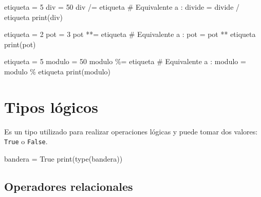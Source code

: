 \documentclass[
  letterpaper,
  DIV=11,
  numbers=noendperiod]{scrreprt}
\newenvironment{Shaded}{\begin{snugshade}}{\end{snugshade}}
\newcommand{\BuiltInTok}[1]{\textcolor[rgb]{0.00,0.23,0.31}{#1}}
\newcommand{\CommentTok}[1]{\textcolor[rgb]{0.37,0.37,0.37}{#1}}
\newcommand{\DecValTok}[1]{\textcolor[rgb]{0.68,0.00,0.00}{#1}}
\newcommand{\NormalTok}[1]{\textcolor[rgb]{0.00,0.23,0.31}{#1}}
\newcommand{\OperatorTok}[1]{\textcolor[rgb]{0.37,0.37,0.37}{#1}}
\newcommand{\VariableTok}[1]{\textcolor[rgb]{0.07,0.07,0.07}{#1}}
\begin{document}
\begin{Shaded}
\begin{Highlighting}[]
\NormalTok{etiqueta }\OperatorTok{=} \DecValTok{5}
\NormalTok{div }\OperatorTok{=} \DecValTok{50}
\NormalTok{div }\OperatorTok{/=}\NormalTok{ etiqueta  }\CommentTok{\# Equivalente a : divide = divide / etiqueta}
\BuiltInTok{print}\NormalTok{(div)}
\end{Highlighting}
\end{Shaded}

\begin{Shaded}
\begin{Highlighting}[]
\NormalTok{etiqueta }\OperatorTok{=} \DecValTok{2}
\NormalTok{pot }\OperatorTok{=} \DecValTok{3}
\NormalTok{pot }\OperatorTok{**=}\NormalTok{ etiqueta }\CommentTok{\# Equivalente a : pot = pot ** etiqueta}
\BuiltInTok{print}\NormalTok{(pot)}
\end{Highlighting}
\end{Shaded}

\begin{Shaded}
\begin{Highlighting}[]
\NormalTok{etiqueta }\OperatorTok{=} \DecValTok{5}
\NormalTok{modulo }\OperatorTok{=} \DecValTok{50}
\NormalTok{modulo }\OperatorTok{\%=}\NormalTok{ etiqueta }\CommentTok{\# Equivalente a : modulo = modulo \% etiqueta}
\BuiltInTok{print}\NormalTok{(modulo)}
\end{Highlighting}
\end{Shaded}

\section{Tipos lógicos}\label{tipos-luxf3gicos}

Es un tipo utilizado para realizar operaciones lógicas y puede tomar dos
valores: \texttt{True} o \texttt{False}.

\begin{Shaded}
\begin{Highlighting}[]
\NormalTok{bandera }\OperatorTok{=} \VariableTok{True}
\BuiltInTok{print}\NormalTok{(}\BuiltInTok{type}\NormalTok{(bandera))}
\end{Highlighting}
\end{Shaded}

\subsection{Operadores relacionales}\label{operadores-relacionales}
\end{document}
